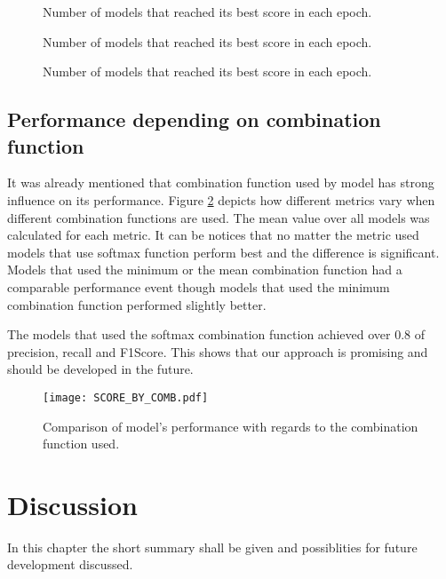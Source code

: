 \documentclass[a4paper,10pt]{report}
\begin{document}
    \begin{figure}[!htb]\centering
      \begin{minipage}{\textwidth}
	\caption{Number of models that reached its best score in each epoch.}\label{SOFT_KILL}
      \end{minipage}
      
      \begin {minipage}{0.49\textwidth}
	\caption{Number of models that reached its best score in each epoch.}\label{MIN_KILL}
      \end{minipage}
      \begin {minipage}{0.49\textwidth}
	\caption{Number of models that reached its best score in each epoch.}\label{MEAN_KILL}
      \end{minipage}
    \end{figure}

    \section{Performance depending on combination function}
      It was already mentioned that combination function used by model has strong influence on its performance. Figure \ref{SCORE_BY_COMB} depicts how different metrics vary when different combination functions are used. The mean value over all models was calculated for each metric. It can be notices that no matter the metric used models that use softmax function perform best and the difference is significant. Models that used the minimum or the mean combination function had a comparable performance event though models that used the minimum combination function performed slightly better.
      
      The models that used the softmax combination function achieved over 0.8 of precision, recall and F1Score. This shows that our approach is promising and should be developed in the future.
    
       \begin{figure}[h!]
	\centering
	\texttt{[image: SCORE\_BY\_COMB.pdf]}
	\caption{Comparison of model's performance with regards to the combination function used.}
	\label{SCORE_BY_COMB}
      \end{figure}
	    
  \chapter{Discussion}
    In this chapter the short summary shall be given and possiblities for future development discussed.
  
\end{document}
